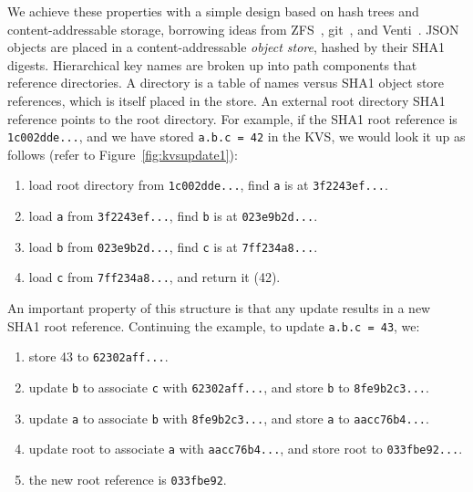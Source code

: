 We achieve these properties with a simple design based on hash trees
and content-addressable storage, borrowing ideas from
ZFS~\cite{Bonwick03thezettabyte}, git~\cite{Chacon:2009:PG:1618548}, and
Venti~\cite{Quinlan:2002:VNA:645371.651321}.
JSON objects are placed in a content-addressable
{\em object store}, hashed by their SHA1 digests.
Hierarchical key names are broken up into path components that reference
directories.
A directory is a table of names versus SHA1 object store references,
which is itself placed in the store.  An external root directory SHA1
reference points to the root directory.
For example, if the SHA1 root reference is {\tt 1c002dde...}, and we have
stored {\tt a.b.c = 42} in the KVS, we would look it up as follows
(refer to Figure~\ref{fig:kvsupdate1}):
\begin{enumerate}
\item{load root directory from {\tt 1c002dde...}, find {\tt a} is at
{\tt 3f2243ef...}.}
\item{load {\tt a} from {\tt 3f2243ef...}, find {\tt b} is at
{\tt 023e9b2d...}.}
\item{load {\tt b} from {\tt 023e9b2d...}, find {\tt c} is at
{\tt 7ff234a8...}.}
\item{load {\tt c} from {\tt 7ff234a8...}, and return it (42).}
\end{enumerate}

An important property of this structure is that any update results
in a new SHA1 root reference.  Continuing the example, to update {\tt a.b.c = 43}, we:
\begin{enumerate}
\item{store 43 to {\tt 62302aff...}.}
\item{update {\tt b} to associate {\tt c} with {\tt 62302aff...}, and store {\tt b} to {\tt 8fe9b2c3...}.}
\item{update {\tt a} to associate {\tt b} with {\tt 8fe9b2c3...}, and store {\tt a} to {\tt aacc76b4...}.}
\item{update root to associate {\tt a} with {\tt aacc76b4...}, and store root to {\tt 033fbe92...}.}
\item{the new root reference is {\tt 033fbe92}.}
\end{enumerate}

